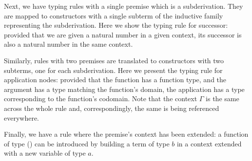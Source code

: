 Next, we have typing rules with a single premise which is a subderivation.
They are mapped to constructors with a single subterm of the inductive family
representing the subderivation.
%
Here we show the typing rule for successor: provided that we are given
a natural number in a given context, its successor is also a natural
number in the same context.

\begin{center}
\begin{minipage}{0.45\textwidth}
\inferenceInc
\end{minipage}\hfill
\begin{minipage}{0.45\textwidth}
\end{minipage}
\end{center}

Similarly, rules with two premises are translated to constructors
with two subterms, one for each subderivation.
%
Here we present the typing rule for application nodes: provided that
the function has a function type, and the argument has a type matching
the function's domain, the application has a type corresponding to the
function's codomain.
Note that the context $\Gamma$ is the same across the whole rule and,
correspondingly, the same  is being referenced everywhere.


\begin{center}
\begin{minipage}{0.35\textwidth}
\inferenceApp
\end{minipage}\hfill
\begin{minipage}{0.55\textwidth}
\end{minipage}
\end{center}

Finally, we have a rule where the premise's context has been extended:
a function of type () can be introduced by building a term
of type $b$ in a context extended with a new variable of type $a$.

\begin{center}
\begin{minipage}{0.35\textwidth}
\inferenceFunc
\end{minipage}\hfill
\begin{minipage}{0.55\textwidth}
\end{minipage}
\end{center}

